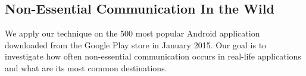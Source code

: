 \subsection{Non-Essential Communication In the Wild}

We apply our technique on the 500 most popular Android application
downloaded from the Google Play store in January 2015.  Our goal is to
investigate how often non-essential communication occurs in real-life
applications and what are its most common destinations.


